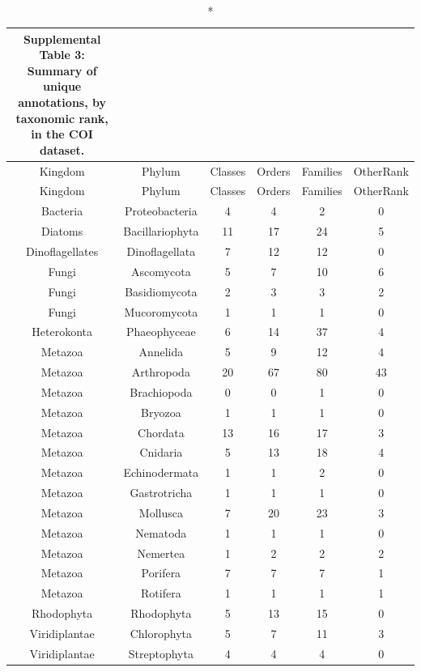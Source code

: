 \documentclass[fleqn,10pt]{wlpeerj}
\begin{document}
\begin{longtable}[]{@{}cccccc@{}}
\caption*{Supplemental Table 3: Summary of unique annotations, by
taxonomic rank, in the COI dataset.}\tabularnewline
\toprule
Kingdom & Phylum & Classes & Orders & Families &
OtherRank\tabularnewline
\midrule
\endfirsthead
\toprule
Kingdom & Phylum & Classes & Orders & Families &
OtherRank\tabularnewline
\midrule
\endhead
Bacteria & Proteobacteria & 4 & 4 & 2 & 0\tabularnewline
Diatoms & Bacillariophyta & 11 & 17 & 24 & 5\tabularnewline
Dinoflagellates & Dinoflagellata & 7 & 12 & 12 & 0\tabularnewline
Fungi & Ascomycota & 5 & 7 & 10 & 6\tabularnewline
Fungi & Basidiomycota & 2 & 3 & 3 & 2\tabularnewline
Fungi & Mucoromycota & 1 & 1 & 1 & 0\tabularnewline
Heterokonta & Phaeophyceae & 6 & 14 & 37 & 4\tabularnewline
Metazoa & Annelida & 5 & 9 & 12 & 4\tabularnewline
Metazoa & Arthropoda & 20 & 67 & 80 & 43\tabularnewline
Metazoa & Brachiopoda & 0 & 0 & 1 & 0\tabularnewline
Metazoa & Bryozoa & 1 & 1 & 1 & 0\tabularnewline
Metazoa & Chordata & 13 & 16 & 17 & 3\tabularnewline
Metazoa & Cnidaria & 5 & 13 & 18 & 4\tabularnewline
Metazoa & Echinodermata & 1 & 1 & 2 & 0\tabularnewline
Metazoa & Gastrotricha & 1 & 1 & 1 & 0\tabularnewline
Metazoa & Mollusca & 7 & 20 & 23 & 3\tabularnewline
Metazoa & Nematoda & 1 & 1 & 1 & 0\tabularnewline
Metazoa & Nemertea & 1 & 2 & 2 & 2\tabularnewline
Metazoa & Porifera & 7 & 7 & 7 & 1\tabularnewline
Metazoa & Rotifera & 1 & 1 & 1 & 1\tabularnewline
Rhodophyta & Rhodophyta & 5 & 13 & 15 & 0\tabularnewline
Viridiplantae & Chlorophyta & 5 & 7 & 11 & 3\tabularnewline
Viridiplantae & Streptophyta & 4 & 4 & 4 & 0\tabularnewline
\bottomrule
\end{longtable}
\end{document}
